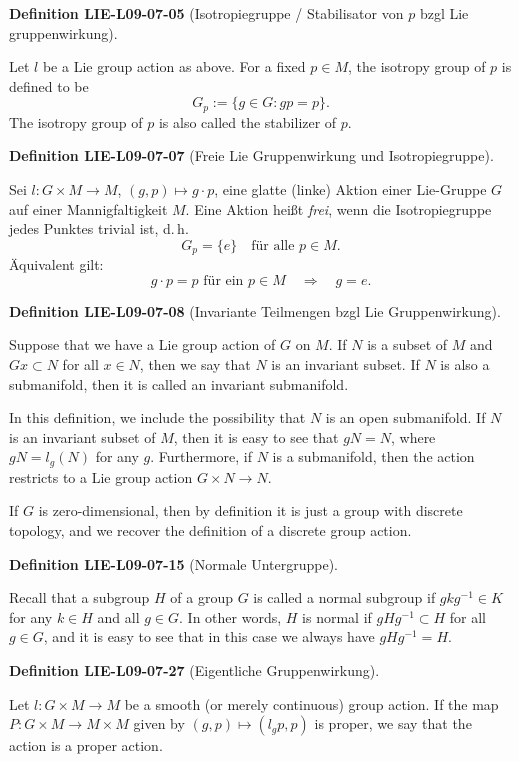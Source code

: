 \documentclass[10pt, letterpaper]{article}
\newcommand{\CustomHeading}[3]{%
  \par\medskip\noindent%
  \textbf{#1 #2} \textnormal{(#3)}.\enskip%
}
\newenvironment{DEF}[2]{\CustomHeading{Definition}{#1}{#2}}{}
\begin{document}
\begin{DEF}{LIE-L09-07-05}{Isotropiegruppe / Stabilisator von $p$ bzgl Lie gruppenwirkung}
Let $l$ be a Lie group action as above. For a fixed $p \in M$, the isotropy group of $p$ is defined to be
$$
G_{p}:=\{g \in G: g p=p\} .
$$
The isotropy group of $p$ is also called the stabilizer of $p$.
\end{DEF}

\begin{DEF}{LIE-L09-07-07}{Freie Lie Gruppenwirkung und Isotropiegruppe}
Sei $l:G\times M\to M$, $(g,p)\mapsto g\cdot p$, eine glatte (linke) Aktion
einer Lie-Gruppe $G$ auf einer Mannigfaltigkeit $M$. Eine Aktion heißt \emph{frei}, wenn die Isotropiegruppe jedes Punktes trivial ist, d.\,h.
\[
G_p = \{e\}
\quad\text{für alle }p\in M.
\]
Äquivalent gilt:
\[
g\cdot p = p \text{ für ein }p\in M
\quad\Longrightarrow\quad g=e.
\]
\end{DEF}

\begin{DEF}{LIE-L09-07-08}{Invariante Teilmengen bzgl Lie Gruppenwirkung}
Suppose that we have a Lie group action of $G$ on $M$. If $N$ is a subset of $M$ and $G x \subset N$ for all $x \in N$, then we say that $N$ is an invariant subset. If $N$ is also a submanifold, then it is called an invariant submanifold.

In this definition, we include the possibility that $N$ is an open submanifold. If $N$ is an invariant subset of $M$, then it is easy to see that $g N=N$, where $g N=l_{g}(N)$ for any $g$. Furthermore, if $N$ is a submanifold, then the action restricts to a Lie group action $G \times N \rightarrow N$.

If $G$ is zero-dimensional, then by definition it is just a group with discrete topology, and we recover the definition of a discrete group action.
\end{DEF}

\begin{DEF}{LIE-L09-07-15}{Normale Untergruppe}
Recall that a subgroup $H$ of a group $G$ is called a normal subgroup if $g k g^{-1} \in K$ for any $k \in H$ and all $g \in G$. In other words, $H$ is normal if $g H g^{-1} \subset H$ for all $g \in G$, and it is easy to see that in this case we always have $g H g^{-1}=H$.
\end{DEF}

\begin{DEF}{LIE-L09-07-27}{Eigentliche Gruppenwirkung}
Let $l: G \times M \rightarrow M$ be a smooth (or merely continuous) group action. If the map $P: G \times M \rightarrow M \times M$ given by $(g, p) \mapsto\left(l_{g} p, p\right)$ is proper, we say that the action is a proper action.
\end{DEF}
\end{document}
